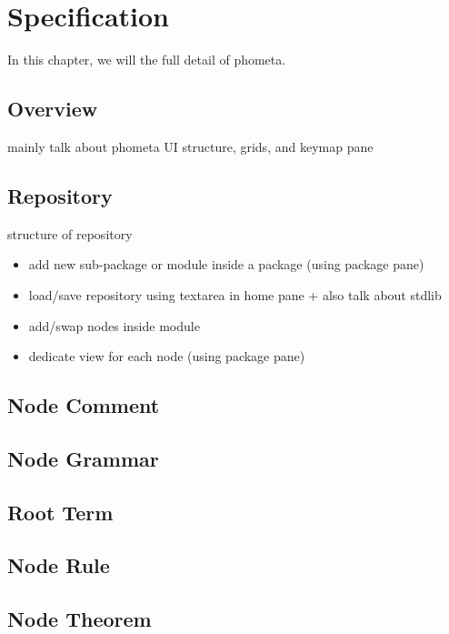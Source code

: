 \documentclass[master.tex]{subfiles}
\begin{document}
\chapter{Specification}
\label{chap:specification}

In this chapter, we will the full detail of phometa.
\section{Overview}
mainly talk about phometa UI structure, grids, and keymap pane

\section{Repository}
structure of repository
\begin{itemize}
\item add new sub-package or module inside a package (using package pane)
\item load/save repository using textarea in home pane + also talk about stdlib
\item add/swap nodes inside module
\item dedicate view for each node (using package pane)
\end{itemize}

\section{Node Comment}
\section{Node Grammar}
\section{Root Term}
\section{Node Rule}
\section{Node Theorem}


\end{document}
